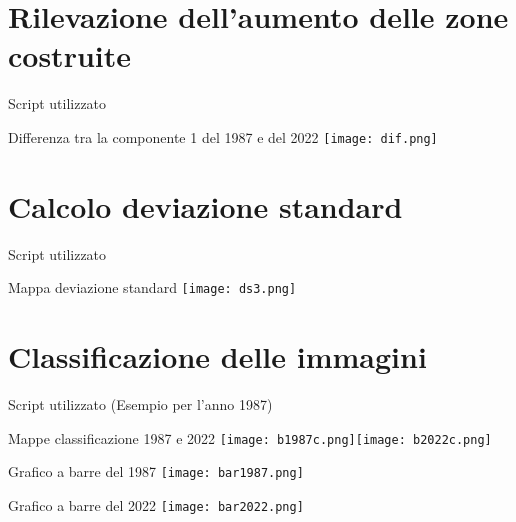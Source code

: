 \documentclass{beamer}
\begin{document}
\section{Rilevazione dell'aumento delle zone costruite}

\begin{frame}{Script utilizzato}
\begin{tiny}

\end{tiny}
\end{frame}

\begin{frame}{Differenza tra la componente 1 del 1987 e del 2022}
\texttt{[image: dif.png]}
\centering
\end{frame}

\section{Calcolo deviazione standard}

\begin{frame}{Script utilizzato}
\begin{tiny}

\end{tiny}
\end{frame}

\begin{frame}{Mappa deviazione standard}
\texttt{[image: ds3.png]}
\centering
\end{frame}

\section{Classificazione delle immagini}

\begin{frame}{Script utilizzato}
(Esempio per l'anno 1987)
\bigskip
\begin{tiny}

\end{tiny}
\end{frame}

\begin{frame}{Mappe classificazione 1987 e 2022}
\centering
\texttt{[image: b1987c.png]}\texttt{[image: b2022c.png]}
\end{frame}

\begin{frame}{Grafico a barre del 1987}
\centering
\texttt{[image: bar1987.png]}
\end{frame}
\begin{frame}{Grafico a barre del 2022}
\centering
\texttt{[image: bar2022.png]}
\end{frame}
\end{document}

